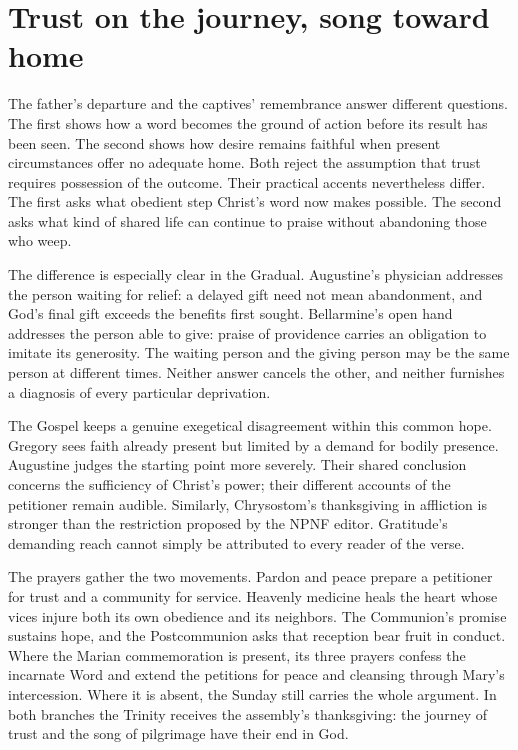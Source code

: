 \section{Trust on the journey, song toward home}
The father's departure and the captives' remembrance answer different
questions. The first shows how a word becomes the ground of action
before its result has been seen. The second shows how desire remains
faithful when present circumstances offer no adequate home. Both reject
the assumption that trust requires possession of the outcome. Their
practical accents nevertheless differ. The first asks what obedient
step Christ's word now makes possible. The second asks what kind of
shared life can continue to praise without abandoning those who weep.

The difference is especially clear in the Gradual. Augustine's physician
addresses the person waiting for relief: a delayed gift need not mean
abandonment, and God's final gift exceeds the benefits first sought.
Bellarmine's open hand addresses the person able to give: praise of
providence carries an obligation to imitate its generosity. The waiting
person and the giving person may be the same person at different times.
Neither answer cancels the other, and neither furnishes a diagnosis of
every particular deprivation.

The Gospel keeps a genuine exegetical disagreement within this common
hope. Gregory sees faith already present but limited by a demand for
bodily presence. Augustine judges the starting point more severely.
Their shared conclusion concerns the sufficiency of Christ's power;
their different accounts of the petitioner remain audible. Similarly,
Chrysostom's thanksgiving in affliction is stronger than the restriction
proposed by the NPNF editor. Gratitude's demanding reach cannot simply
be attributed to every reader of the verse.

The prayers gather the two movements. Pardon and peace prepare a
petitioner for trust and a community for service. Heavenly medicine
heals the heart whose vices injure both its own obedience and its
neighbors. The Communion's promise sustains hope, and the Postcommunion
asks that reception bear fruit in conduct. Where the Marian commemoration
is present, its three prayers confess the incarnate Word and extend the
petitions for peace and cleansing through Mary's intercession. Where
it is absent, the Sunday still carries the whole argument. In both
branches the Trinity receives the assembly's thanksgiving: the journey
of trust and the song of pilgrimage have their end in God.
